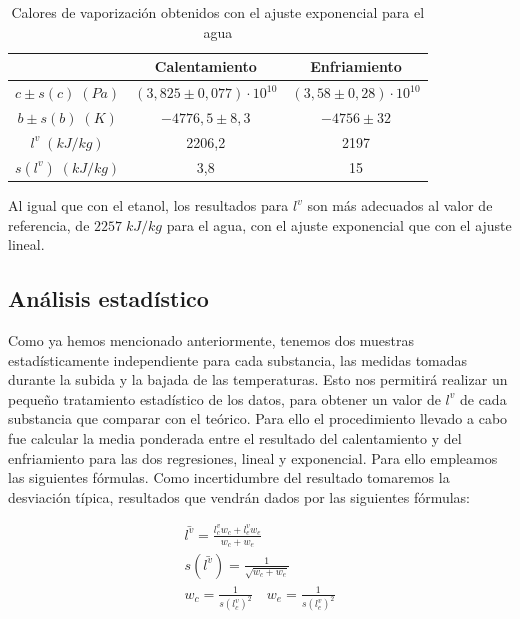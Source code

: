 \documentclass[a4paper,12pt,titlepage]{article}
\begin{document}
\begin{table}[h!]
\centering
\begin{tabular}{c|c|c|}
\cline{2-3}
    & Calentamiento   & Enfriamiento                    \\ \hline
\multicolumn{1}{|c|}{$c \pm s(c) \;(Pa)$} & $(3,825 \pm 0,077) \cdot 10^{10}$ & $(3,58 \pm 0,28) \cdot 10^{10}$ \\ \hline
\multicolumn{1}{|c|}{$b \pm s(b) \; (K)$} & $-4776,5 \pm 8,3$                 & $-4756 \pm 32$                  \\ \hline
\multicolumn{1}{|c|}{$l^v\;(kJ/kg)$}       & 2206,2                            & 2197                            \\ \hline
\multicolumn{1}{|c|}{$s(l^v)\;(kJ/kg)$}    & 3,8                               & 15                              \\ \hline
\end{tabular}
\caption{Calores de vaporización obtenidos con el ajuste exponencial para el agua}
\label{tab:my-table}
\end{table}

Al igual que con el etanol, los resultados para $l^v$ son más adecuados al valor de referencia, de $2257 \; kJ/kg$ para el agua, con el ajuste exponencial que con el ajuste lineal.


\subsection{Análisis estadístico}

Como ya hemos mencionado anteriormente, tenemos dos muestras estadísticamente independiente para cada substancia, las medidas tomadas durante la subida y la bajada de las temperaturas. Esto nos permitirá realizar un pequeño tratamiento estadístico de los datos, para obtener un valor de $l^v$ de cada substancia que comparar con el teórico. Para ello el procedimiento llevado a cabo fue calcular la media ponderada entre el resultado del calentamiento y del enfriamiento para las dos regresiones, lineal y exponencial. Para ello empleamos las siguientes fórmulas. Como incertidumbre del resultado tomaremos la desviación típica, resultados que vendrán dados por las siguientes fórmulas:

\begin{equation}
    \begin{gathered}
        \bar{l^v} = \frac{l^v_c w_c + l^v_e w_e}{w_c+w_e} \\
        s(\bar{l^v}) = \frac{1}{\sqrt{w_c + w_e}} \\
        w_c = \frac{1}{s(l^v_c)^2} \quad w_e = \frac{1}{s(l^v_e)^2}
    \end{gathered}
\end{equation}
\end{document}
